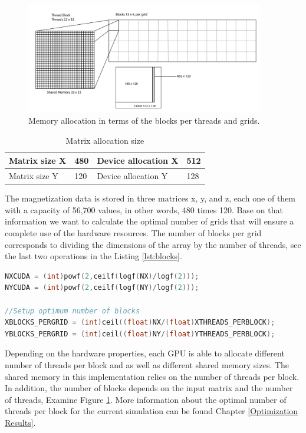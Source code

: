\begin{figure}[htbp]
	\centering
		\includegraphics[width=0.93\textwidth]{Figures/block.png}
		\smallskip
	\caption[Grid layout]{Memory allocation in terms of the blocks per threads and grids.}
	\label{fig:block}
\end{figure}


\begin{table}[h]
\centering
\begin{tabular}{| l | l | l | l | }
\hline
Matrix size X & 480 & Device allocation X & 512\\
\hline
Matrix size Y & 120 & Device allocation Y & 128 \\
\hline
\end{tabular}
\caption{Matrix allocation size}
\label{tab:cuda}
\end{table}

The magnetization data is stored in three matrices x, y, and z, each one of them with a capacity of 56,700 values, in other words, 480 times 120. Base on that information we want to calculate the optimal number of grids that will ensure a complete use of the hardware resources. The number of blocks per grid corresponds to dividing the dimensions of the array by the number of threads, see the last two operations in the Listing \ref{lst:blocks}.

\begin{lstlisting}[language=C++, label={lst:blocks}, caption={Device capacity calculation and number of block per grid}]	
NXCUDA = (int)powf(2,ceilf(logf(NX)/logf(2)));
NYCUDA = (int)powf(2,ceilf(logf(NY)/logf(2)));

//Setup optimum number of blocks
XBLOCKS_PERGRID = (int)ceil((float)NX/(float)XTHREADS_PERBLOCK); 
YBLOCKS_PERGRID = (int)ceil((float)NY/(float)YTHREADS_PERBLOCK);
\end{lstlisting}

Depending on the hardware properties, each GPU is able to allocate different number of threads per block and as well as different shared memory sizes. The shared memory in this implementation relies on the number of threads per block. In addition, the number of blocks depends on the input matrix and the number of threads, Examine Figure \ref{fig:block}. More information about the optimal number of threads per block for the current simulation can be found Chapter \ref{Optimization Results}. 

